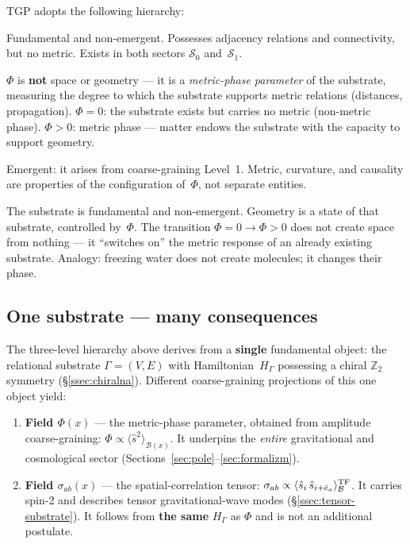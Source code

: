\begin{remark}\label{rem:ontologia}
TGP adopts the following hierarchy:
\begin{description}[style=nextline,nosep]
  \item[Level 0: Relational substrate $\Gamma = (V, E)$]
    Fundamental and non-emergent.  Possesses adjacency relations
    and connectivity, but no metric.  Exists in both sectors
    $\mathcal{S}_0$ and~$\mathcal{S}_1$.
  \item[Level 1: Spatial field $\Phi$ (metric-phase parameter)]
    $\Phi$ is \textbf{not} space or geometry --- it is a
    \emph{metric-phase parameter} of the substrate, measuring the
    degree to which the substrate supports metric relations
    (distances, propagation).
    $\Phi = 0$: the substrate exists but carries no metric
    (non-metric phase).
    $\Phi > 0$: metric phase --- matter endows the substrate
    with the capacity to support geometry.
  \item[Level 2: Effective geometry $g_{\mu\nu}$]
    Emergent: it arises from coarse-graining Level~1.
    Metric, curvature, and causality are properties of the
    configuration of~$\Phi$, not separate entities.
\end{description}
The substrate is fundamental and non-emergent.  Geometry is a state
of that substrate, controlled by~$\Phi$.  The transition
$\Phi = 0 \to \Phi > 0$ does not create space from nothing ---
it ``switches on'' the metric response of an already existing
substrate.  Analogy: freezing water does not create molecules; it
changes their phase.
\end{remark}

\subsection{One substrate --- many consequences}\label{rem:jeden-substrat}

The three-level hierarchy above derives from a \textbf{single}
fundamental object: the relational substrate $\Gamma = (V,E)$ with
Hamiltonian~$H_\Gamma$ possessing a chiral $\mathbb{Z}_2$ symmetry
(\S\ref{ssec:chiralna}).  Different coarse-graining projections of
this one object yield:

\begin{enumerate}[nosep]
  \item \textbf{Field $\Phi(x)$} --- the metric-phase parameter,
    obtained from amplitude coarse-graining:
    $\Phi \propto \langle\hat{s}^2\rangle_{\mathcal{B}(x)}$.
    It underpins the \emph{entire} gravitational and cosmological
    sector (Sections~\ref{sec:pole}--\ref{sec:formalizm}).
  \item \textbf{Field $\sigma_{ab}(x)$} --- the spatial-correlation
    tensor:
    $\sigma_{ab} \propto
    \langle\hat{s}_i\,\hat{s}_{i+\hat{e}_a}\rangle_{\mathcal{B}}^{\rm TF}$.
    It carries spin-2 and describes tensor gravitational-wave modes
    (\S\ref{ssec:tensor-substrate}).
    It follows from \textbf{the same} $H_\Gamma$ as $\Phi$ and is
    not an additional postulate.
\end{enumerate}

